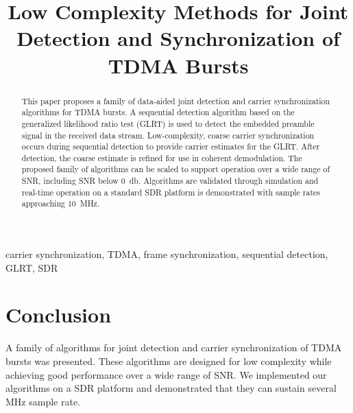 \documentclass[10pt,final,conference,comsoc]{IEEEtran}
\begin{document}
\title{Low Complexity Methods for Joint Detection and Synchronization of TDMA Bursts}
\author{
}

\maketitle

\begin{abstract}
This paper proposes a family of data-aided joint detection and carrier synchronization algorithms for 
TDMA bursts.
A sequential detection algorithm based on the generalized likelihood ratio test (GLRT)
is used to detect the embedded preamble signal in the received data
stream.
Low-complexity, coarse carrier synchronization 
occurs during sequential detection to provide carrier estimates for
the GLRT.\@
After detection,
the coarse estimate is refined for use in coherent demodulation.
The proposed family of algorithms can be scaled to support operation
over a wide range of SNR, including SNR below \SI{0}{\decibel}.
Algorithms are validated through simulation and real-time operation on
a standard SDR platform is demonstrated with sample rates approaching
\SI{10}{\mega\hertz}.

\end{abstract}

\begin{IEEEkeywords}
carrier synchronization, TDMA, frame synchronization, sequential
detection, GLRT, SDR
\end{IEEEkeywords}













\section{Conclusion}

A family of algorithms for joint detection and carrier synchronization
of TDMA bursts was presented.
These algorithms are designed for low complexity while achieving good
performance over a wide range of SNR.\@
We implemented our algorithms on a SDR platform and demonstrated that
they can sustain several \si{\mega\hertz} sample rate.



\end{document}
